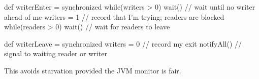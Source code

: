
\begin{slide}

\begin{scala}
  def writerEnter = synchronized{
    while(writers > 0) wait() // wait until no writer ahead of me
    writers = 1 // record that I'm trying; readers are blocked
    while(readers > 0) wait() // wait for readers to leave
  }

  def writerLeave = synchronized{
    writers = 0 // record my exit
    notifyAll() // signal to waiting reader or writer
  }
\end{scala}

This avoids starvation provided the JVM monitor is fair.
\end{slide}

